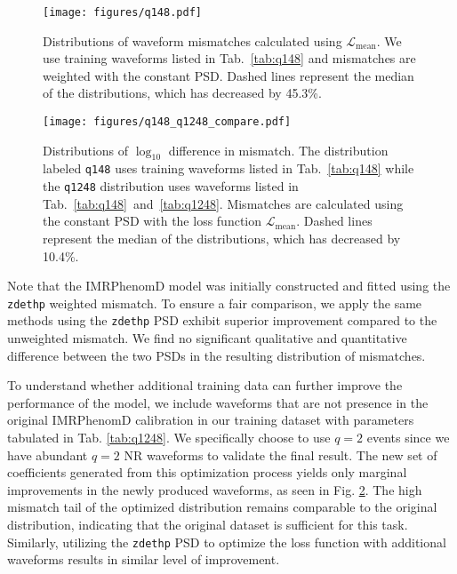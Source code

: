 \documentclass[twocolumn]{aastex631}
\newcommand{\zdethp}{\texttt{zdethp}}
\begin{document}
\begin{figure}[t]
	\centering
	\texttt{[image: figures/q148.pdf]}
	\caption{Distributions of waveform mismatches calculated using 
	$\mathcal{L}_{\mathrm{mean}}$. We use training waveforms listed in 
	Tab.~\ref{tab:q148} and	mismatches are weighted with the constant PSD. 
	Dashed lines represent the median of the distributions, which has decreased by 45.3\%.}
	\label{fig:q148}
\end{figure}
\begin{figure}[t]
	\centering
	\texttt{[image: figures/q148\_q1248\_compare.pdf]}
	\caption{Distributions of $\log_{10}$ difference in mismatch. The
	distribution labeled \texttt{q148} uses training waveforms listed in
	Tab.~\ref{tab:q148} while the \texttt{q1248} distribution uses waveforms
	listed in Tab.~\ref{tab:q148}~and~\ref{tab:q1248}. Mismatches are calculated
	using the constant PSD with the loss function $\mathcal{L}_{\mathrm{mean}}$. 
	Dashed lines represent the median of the distributions, which has decreased by 10.4\%.}
	\label{fig:q148_q1248_compare}
\end{figure}

Note that the IMRPhenomD model was initially constructed and fitted using the
{\zdethp} weighted mismatch. To ensure a fair comparison, we apply the same
methods using the {\zdethp} PSD exhibit superior improvement compared to the
unweighted mismatch. We find no significant qualitative and quantitative
difference between the two PSDs in the resulting distribution of mismatches.

To understand whether additional training data can further improve the
performance of the model, we include waveforms that are not presence in the
original IMRPhenomD calibration in our training dataset with parameters
tabulated in Tab. \ref{tab:q1248}. We specifically choose to use $q=2$ events
since we have abundant $q=2$ NR waveforms to validate the final result. The new
set of coefficients generated from this optimization process yields only
marginal improvements in the newly produced waveforms, as seen in Fig.
\ref{fig:q148_q1248_compare}. The high mismatch tail of the optimized
distribution remains comparable to the original distribution, indicating that
the original dataset is sufficient for this task. Similarly, utilizing the
{\zdethp} PSD to optimize the loss function with additional waveforms results in 
similar level of improvement.
\end{document}
